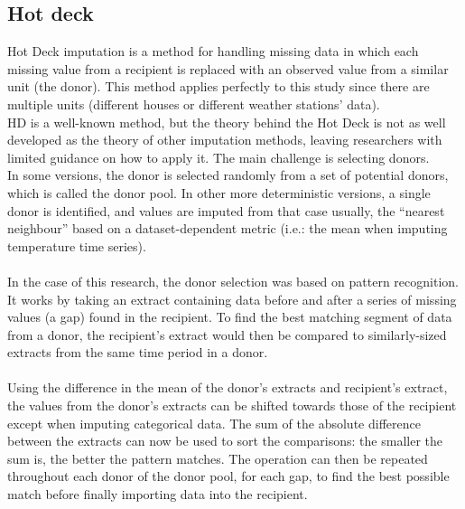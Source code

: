 \documentclass[9.5pt,article,twocolumn]{article}
\begin{document}
\subsection{Hot deck}
Hot Deck imputation is a method for handling missing data in which each missing value from a recipient is replaced with an observed value from a similar unit (the donor). This method applies perfectly to this study since there are multiple units (different houses or different weather stations’ data).
\\
HD is a well-known method, but the theory behind the Hot Deck is not as well developed as the theory of other imputation methods, leaving researchers with limited guidance on how to apply it. The main challenge is selecting donors.
\\
In some versions, the donor is selected randomly from a set of potential donors, which is called the donor pool. In other more deterministic versions, a single donor is identified, and values are imputed from that case usually, the “nearest neighbour” based on a dataset-dependent metric (i.e.: the mean when imputing temperature time series).
\\
\\
In the case of this research, the donor selection was based on pattern recognition. It works by taking an extract containing data before and after a series of missing values (a gap) found in the recipient. To find the best matching segment of data from a donor, the recipient’s extract would then be compared to similarly-sized extracts from the same time period in a donor.
\\
\\
Using the difference in the mean of the donor’s extracts and recipient’s extract, the values from the donor’s extracts can be shifted towards those of the recipient except when imputing categorical data.
The sum of the absolute difference between the extracts can now be used to sort the comparisons: the smaller the sum is, the better the pattern matches. The operation can then be repeated throughout each donor of the donor pool, for each gap, to find the best possible match before finally importing data into the recipient.
\end{document}

